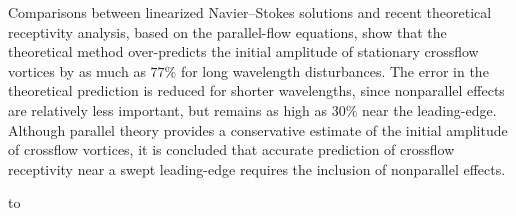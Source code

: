 Comparisons between linearized Navier--Stokes solutions and recent theoretical
receptivity analysis, based on the parallel-flow equations, show that the
theoretical method over-predicts the initial amplitude of stationary crossflow
vortices by as much as $77\%$ for long wavelength disturbances.  The error in
the theoretical prediction is reduced for shorter wavelengths, since
nonparallel effects are relatively less important, but remains as high as
$30\%$ near the leading-edge.  Although parallel theory provides a
conservative estimate of the initial amplitude of crossflow vortices, it is
concluded that accurate prediction of crossflow receptivity near a swept
leading-edge requires the inclusion of nonparallel effects.

\bigskip
\bigskip
\vbox{\hbox to }

\bye
